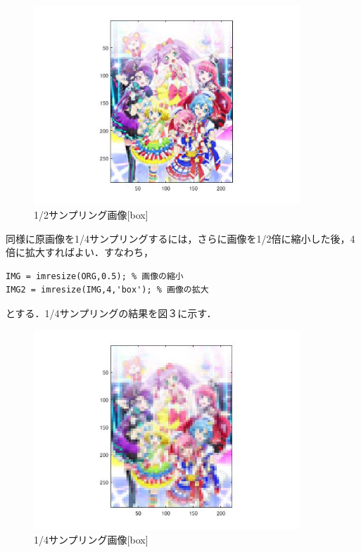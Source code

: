 \documentclass{jsarticle}
\begin{document}
\begin{figure}[htbp]
 \begin{center}
  \includegraphics[width=10cm]{kadai1-1.jpg}
 \end{center}
 \caption{1/2サンプリング画像[box]}
\end{figure}

同様に原画像を1/4サンプリングするには，さらに画像を1/2倍に縮小した後，4倍に拡大すればよい．すなわち，

\begin{lstlisting}[basicstyle=\ttfamily\footnotesize, frame=single]
IMG = imresize(ORG,0.5); % 画像の縮小
IMG2 = imresize(IMG,4,'box'); % 画像の拡大
 \end{lstlisting}

とする．1/4サンプリングの結果を図３に示す．

\begin{figure}[htbp]
 \begin{center}
  \includegraphics[width=10cm]{kadai1-2.jpg}
 \end{center}
 \caption{1/4サンプリング画像[box]}
\end{figure}
\end{document}
